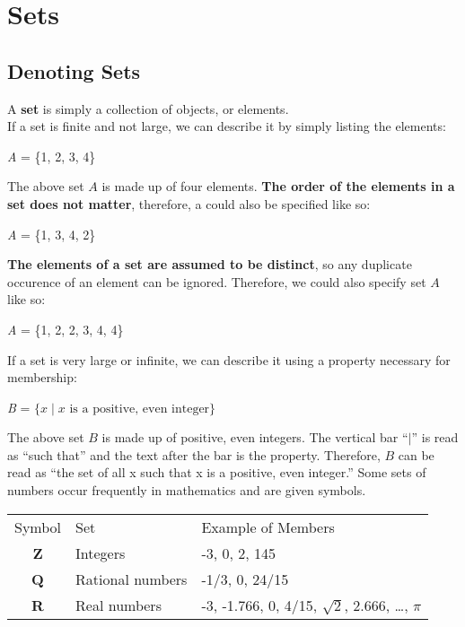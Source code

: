 \section*{Sets}

\subsection*{Denoting Sets}

A \textbf{set} is simply a collection of objects, or elements.\\
If a set is finite and not large, we can describe it by simply listing the elements:

\begin{center}
\textit{A} = \{1, 2, 3, 4\}
\end{center}


The above set $A$ is made up of four elements.  \textbf{The order of the elements in a set does not matter}, therefore, a could also be specified like so:

\begin{center}
\textit{A} = \{1, 3, 4, 2\}
\end{center}

\textbf{The elements of a set are assumed to be distinct}, so any duplicate occurence of an element can be ignored.  Therefore, we could also specify set $A$ like so:

\begin{center}
\textit{A} = \{1, 2, 2, 3, 4, 4\}
\end{center}


If a set is very large or infinite, we can describe it using a property necessary for membership:

\begin{center}
\textit{B} = $\{x \mid x \text{ is a positive, even integer}\}$
\end{center}

The above set $B$ is made up of positive, even integers.  The vertical bar ``$\mid$'' is read as ``such that'' and the text after the bar is the property.  Therefore, $B$ can be read as ``the set of all x such that x is a positive, even integer.''
Some sets of numbers occur frequently in mathematics and are given symbols.

\begin{table}[]
\begin{tabular}{cll}
\multicolumn{1}{l}{Symbol} & Set              & Example of Members         \\
\textbf{Z}                 & Integers         & -3, 0, 2, 145              \\
\textbf{Q}                 & Rational numbers & -1/3, 0, 24/15             \\
\textbf{R}                 & Real numbers     & -3, -1.766, 0, 4/15, $\sqrt{2}$, 2.666, \dots, $\pi$
\end{tabular}
\end{table}

